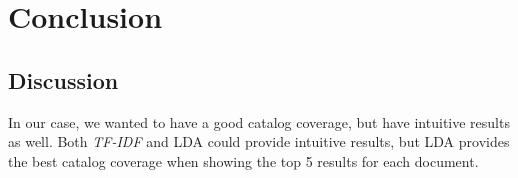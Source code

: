 \chapter{Conclusion} \label{chp:conclusion}

\section{Discussion}
In our case, we wanted to have a good catalog coverage, but have intuitive results as well. Both \emph{TF-IDF} and LDA could provide intuitive results, but LDA provides the best catalog coverage when showing the top 5 results for each document.

\cite{missing}